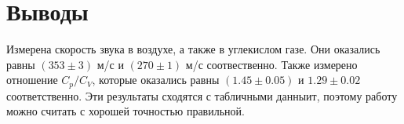 \section{Выводы}

Измерена скорость звука в воздухе, а также в углекислом газе. Они оказались равны $(353 \pm 3)$ м/с и $(270 \pm 1)$ м/с соотвественно. Также измерено отношение $C_p/C_V$, которые оказались равны $(1.45 \pm 0.05)$ и $1.29 \pm 0.02$ соответственно. Эти результаты сходятся с табличными данныит, поэтому работу можно считать с хорошей точностью правильной.
